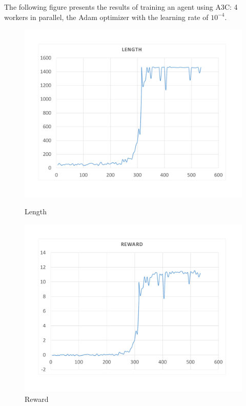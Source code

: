 The following figure presents the results of training an agent using A3C: 4 workers in parallel, the Adam optimizer with the learning rate of $10^{-4}$.
\begin{figure}[H]
	\includegraphics[width=\linewidth]{Figures/Length}
	\caption{Length}\label{fig:Length}
	\endminipage\hfill
	\includegraphics[width=\linewidth]{Figures/Reward}
	\caption{Reward}\label{fig:Reward}
	\endminipage
\end{figure}
